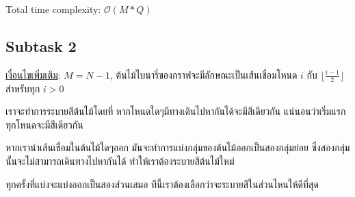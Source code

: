 \documentclass[12pt]{article}
\newcommand{\floor}[1]{\lfloor #1 \rfloor}
\begin{document}
Total time complexity: $\mathcal{O}(M*Q)$

\subsection{Subtask 2}

\underline{เงื่อนไขเพิ่มเติม}: $M = N-1$,  ต้นไม้ไบนารี่ของกราฟจะมีลักษณะเป็นเส้นเชื่อมโหนด $i$ กับ $\floor{\frac{i-1}{2}}$ สำหรับทุก $i > 0$

เราจะทำการระบายสีต้นไม้โดยที่ หากโหนดใดๆมีทางเดินไปหากันได้จะมีสีเดียวกัน แน่นอนว่าเริ่มแรกทุกโหนดจะมีสีเดียวกัน

หากเรานำเส้นเชื่อมในต้นไม้ใดๆออก มันจะทำการแบ่งกลุ่มของต้นไม้ออกเป็นสองกลุ่มย่อย ซึ่งสองกลุ่มนั้นจะไม่สามารถเดินทางไปหากันได้ ทำให้เราต้องระบายสีต้นไม้ใหม่

\begin{figure}[h]
  \centering
  \hfill
  \hfill
\end{figure}

ทุกครั้งที่แบ่งจะแบ่งออกเป็นสองส่วนเสมอ ทีนี้เราต้องเลือกว่าจะระบายสีในส่วนไหนให้ดีที่สุด

\end{document}
